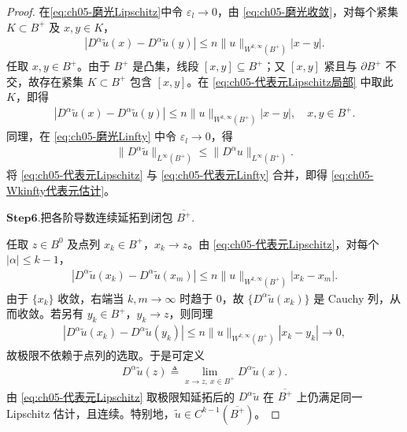 \documentclass[../../main.tex]{subfiles}
\begin{document}
\begin{proof}
在\eqref{eq:ch05-磨光Lipschitz}中令 $\varepsilon_l\to 0$，由 \eqref{eq:ch05-磨光收敛}，对每个紧集 $K\subset B^{+}$ 及 $x,y\in K$，
\begin{align}
|D^{\alpha}\widetilde{u}(x)-D^{\alpha}\widetilde{u}(y)|
\leqslant n\|u\|_{W^{k,\infty}(B^{+})}|x-y|.
\label{eq:ch05-代表元Lipschitz局部}
\end{align}
任取 $x,y\in B^{+}$。由于 $B^{+}$ 是凸集，线段 $[x,y]\subseteq B^{+}$；又 $[x,y]$ 紧且与 $\partial B^{+}$ 不交，故存在紧集 $K\subset B^{+}$ 包含 $[x,y]$。在 \eqref{eq:ch05-代表元Lipschitz局部} 中取此 $K$，即得
\begin{align}
|D^{\alpha}\widetilde{u}(x)-D^{\alpha}\widetilde{u}(y)|
\leqslant n\|u\|_{W^{k,\infty}(B^{+})}|x-y|,\quad x,y\in B^{+}.
\label{eq:ch05-代表元Lipschitz}
\end{align}
同理，在 \eqref{eq:ch05-磨光Linfty} 中令 $\varepsilon_l\to 0$，得
\begin{align}
\|D^{\alpha}\widetilde{u}\|_{L^{\infty}(B^{+})}
\leqslant\|D^{\alpha}u\|_{L^{\infty}(B^{+})}.
\label{eq:ch05-代表元Linfty}
\end{align}
将 \eqref{eq:ch05-代表元Lipschitz} 与 \eqref{eq:ch05-代表元Linfty} 合并，即得 \eqref{eq:ch05-Wkinfty代表元估计}。

\noindent$\mathbf{Step}\bm{6}$.{\heiti 把各阶导数连续延拓到闭包 $\overline{B^{+}}$.}

任取 $z\in B^{0}$ 及点列 $x_k\in B^{+}$，$x_k\to z$。由 \eqref{eq:ch05-代表元Lipschitz}，对每个 $|\alpha|\leqslant k-1$，
\begin{align*}
|D^{\alpha}\widetilde{u}(x_k)-D^{\alpha}\widetilde{u}(x_m)|
\leqslant n\|u\|_{W^{k,\infty}(B^{+})}|x_k-x_m|.
\end{align*}
由于 $\{x_k\}$ 收敛，右端当 $k,m\to\infty$ 时趋于 $0$，故 $\{D^{\alpha}\widetilde{u}(x_k)\}$ 是 Cauchy 列，从而收敛。若另有 $y_k\in B^{+}$，$y_k\to z$，则同理
\begin{align*}
|D^{\alpha}\widetilde{u}(x_k)-D^{\alpha}\widetilde{u}(y_k)|
\leqslant n\|u\|_{W^{k,\infty}(B^{+})}|x_k-y_k|\longrightarrow0,
\end{align*}
故极限不依赖于点列的选取。于是可定义
\begin{align*}
D^{\alpha}\widetilde{u}(z)\triangleq\lim_{x\to z,\ x\in B^{+}}D^{\alpha}\widetilde{u}(x).
\end{align*}
由 \eqref{eq:ch05-代表元Lipschitz} 取极限知延拓后的 $D^{\alpha}\widetilde{u}$ 在 $\overline{B^{+}}$ 上仍满足同一 Lipschitz 估计，且连续。特别地，$\widetilde{u}\in C^{k-1}(\overline{B^{+}})$。
\end{proof}
\end{document}
